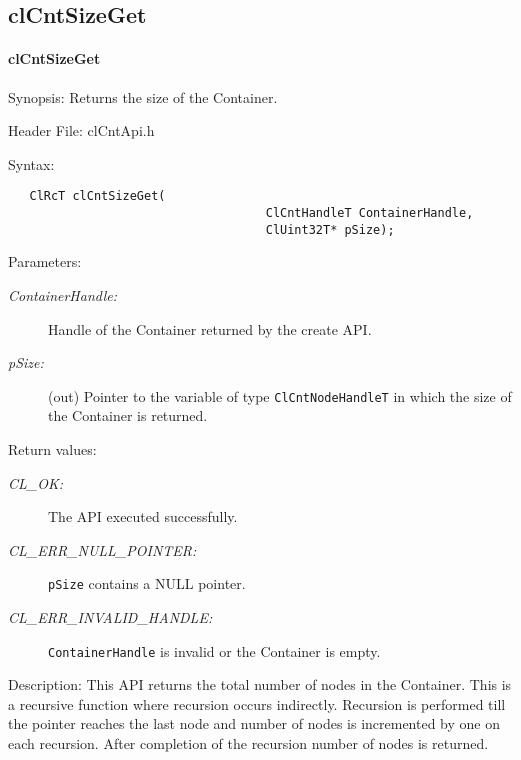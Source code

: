 \subsection{clCntSizeGet}
\hypertarget{pagecnt118}{}\paragraph{cl\-Cnt\-Size\-Get}\label{pagecnt118}
\begin{Desc}
\item[Synopsis:]Returns the size of the Container.\end{Desc}
\begin{Desc}
\item[Header File:]clCntApi.h\end{Desc}
\begin{Desc}
\item[Syntax:]

\footnotesize\begin{verbatim}   ClRcT clCntSizeGet(
                             		ClCntHandleT ContainerHandle,
                             		ClUint32T* pSize);
\end{verbatim}
\normalsize
\end{Desc}
\begin{Desc}
\item[Parameters:]
\begin{description}
\item[{\em Container\-Handle:}]Handle of the Container returned by the create API. 
\item[{\em p\-Size:}](out) Pointer to the variable of type {\tt{ClCntNodeHandleT}} in which the size of the Container is returned.\end{description}
\end{Desc}
\begin{Desc}
\item[Return values:]
\begin{description}
\item[{\em CL\_\-OK:}]The API executed successfully. 
\item[{\em CL\_\-ERR\_\-NULL\_\-POINTER:}]{\tt{pSize}} contains a NULL pointer. 
\item[{\em CL\_\-ERR\_\-INVALID\_\-HANDLE:}]{\tt{ContainerHandle}} is invalid or the Container is empty.
\end{description}
\end{Desc}
\begin{Desc}
\item[Description:]This API returns the total number of nodes in the Container. This is a recursive function where recursion occurs
indirectly. Recursion is performed till the pointer reaches the last node and number of nodes is incremented by one on each recursion. After completion of 
the recursion number of nodes is returned.
\end{Desc}
